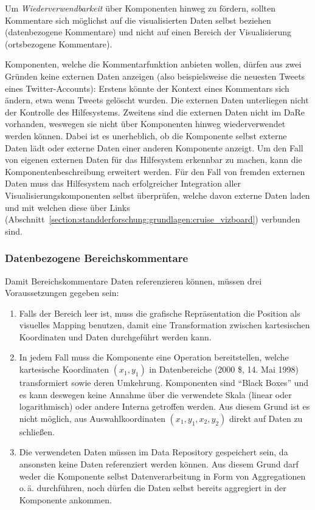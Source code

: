 \documentclass[
	headsepline,
	footsepline,
	fontsize=12pt,
	bibliography=totoc
]{scrbook}
\begin{document}

Um \emph{Wiederverwendbarkeit} über Komponenten hinweg zu fördern, sollten Kommentare sich möglichst auf die visualisierten Daten selbst beziehen (datenbezogene Kommentare) und nicht auf einen Bereich der Visualisierung (ortsbezogene Kommentare).

Komponenten, welche die Kommentarfunktion anbieten wollen, dürfen aus zwei Gründen keine externen Daten anzeigen (also beispielsweise die neuesten Tweets eines Twitter-Accounts): Erstens könnte der Kontext eines Kommentars sich ändern, etwa wenn Tweets gelöscht wurden. Die externen Daten unterliegen nicht der Kontrolle des Hilfesystems. Zweitens sind die externen Daten nicht im DaRe vorhanden, weswegen sie nicht über Komponenten hinweg wiederverwendet werden können. Dabei ist es unerheblich, ob die Komponente selbst externe Daten lädt oder externe Daten einer anderen Komponente anzeigt. Um den Fall von eigenen externen Daten für das Hilfesystem erkennbar zu machen, kann die Komponentenbeschreibung erweitert werden. Für den Fall von fremden externen Daten muss das Hilfesystem nach erfolgreicher Integration aller Visualisierungskomponenten selbst überprüfen, welche davon externe Daten laden und mit welchen diese über Links (Abschnitt~\ref{section:standderforschung:grundlagen:cruise_vizboard}) verbunden sind.

\subsubsection{Datenbezogene Bereichskommentare}

Damit Bereichskommentare Daten referenzieren können, müssen drei Voraussetzungen gegeben sein:

\begin{enumerate}
	\item Falls der Bereich leer ist, muss die grafische Repräsentation die Position als visuelles Mapping benutzen, damit eine Transformation zwischen kartesischen Koordinaten und Daten durchgeführt werden kann.
	\item In jedem Fall muss die Komponente eine Operation bereitstellen, welche kartesische Koordinaten $(x_1,y_1)$ in Datenbereiche (2000 \$, 14. Mai 1998) transformiert sowie deren Umkehrung. Komponenten sind \enquote{Black Boxes} und es kann deswegen keine Annahme über die verwendete Skala (linear oder logarithmisch) oder andere Interna getroffen werden. Aus diesem Grund ist es nicht möglich, aus Auswahlkoordinaten $(x_1,y_1,x_2,y_2)$ direkt auf Daten zu schließen.
	\item Die verwendeten Daten müssen im Data Repository gespeichert sein, da ansonsten keine Daten referenziert werden können. Aus diesem Grund darf weder die Komponente selbst Datenverarbeitung in Form von Aggregationen o.\,ä. durchführen, noch dürfen die Daten selbst bereits aggregiert in der Komponente ankommen.
\end{enumerate}
\end{document}
